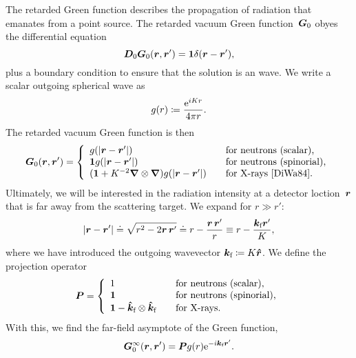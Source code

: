 The retarded Green function describes the propagation of radiation
that emanates from a point source.
The retarded vacuum Green function~$\bm{G}_0$ obyes the differential equation
\begin{equation}\label{EdefGo}
  \TDo \TGo(\r,\r') = \v1 \delta(\r-\r'),
\end{equation}
plus a boundary condition to ensure that the solution is an  wave.
We write a scalar outgoing spherical wave as
\begin{equation}\label{Egr}
  g(r)
  \coloneqq \frac{\e^{iKr}}{4\pi r}.
\end{equation}
The retarded vacuum Green function is then
\begin{equation}\label{EGo}
  \TGo(\r,\r')
  = \left\{ \begin{array}{ll}
      g(|\r-\r'|)                                   &\text{~~~for neutrons (scalar),}\\
      \v1 g(|\r-\r'|)                               &\text{~~~for neutrons (spinorial),}\\
      (\v1 + K^{-2}\Nabla\otimes\Nabla) g(|\r-\r'|)  &\text{~~~for X-rays \cite{DiWa84}.}
  \end{array}\right.
\end{equation}
Ultimately, we will be interested in the radiation intensity
at a detector loction~$\bm{r}$ that is far away from the scattering target.
We expand for $r\gg r'$:
\begin{equation}\label{Effa}
  \left|\r-\r'\right|
  \doteq \sqrt{r^2-2\r\,\r'}
  \doteq r - \frac{\r\,\r'}{r}
  \equiv r - \frac{\k_\sf \r'}{K},
\end{equation}
%
where we have introduced the outgoing wavevector
$  {\bm{k}}_{\text{f}}\coloneqq K \bm{\hat r}$.
We define the projection operator
\begin{equation}\label{EdefP}
  \v{P}
  = \left\{ \begin{array}{ll}
      1                                        &\text{~~~for neutrons (scalar),}\\
      \v1                                      &\text{~~~for neutrons (spinorial),}\\
      \v1 - \v{\hat k}_\sf\otimes\v{\hat k}_\sf &\text{~~~for X-rays.}
  \end{array}\right.
\end{equation}
With this, we find the far-field asymptote of the Green function,
\begin{equation}\label{EGoInfty}
  \TGo^\infty(\r,\r')
  = \v{P}g(r)\e^{-i\k_\sf\r'}.
\end{equation}

